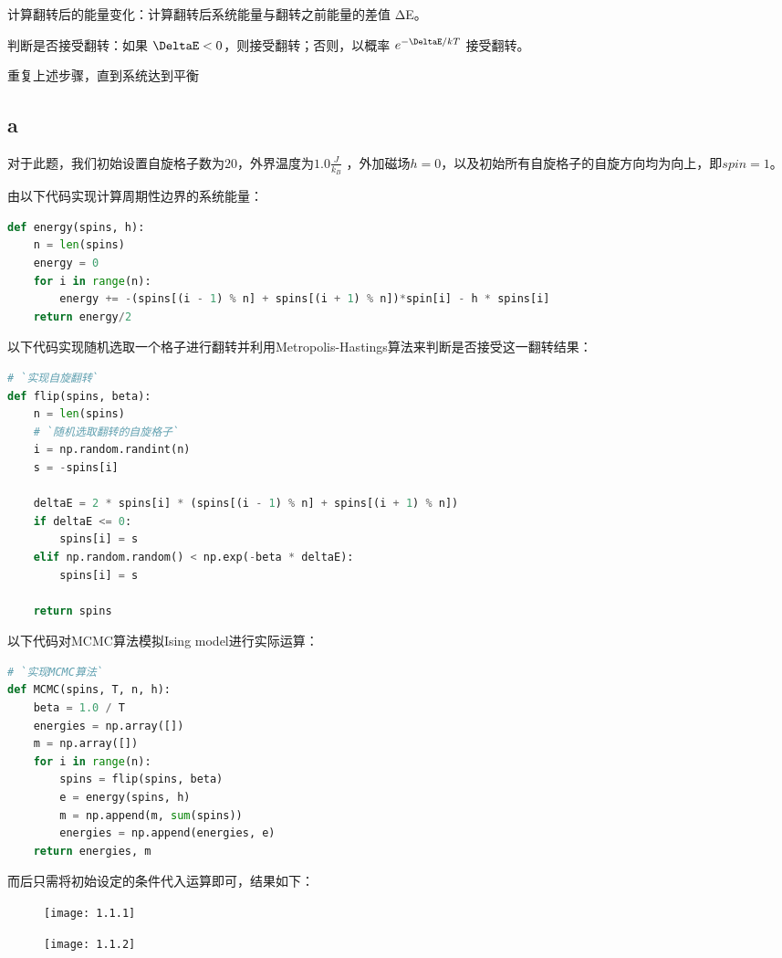 \documentclass[UTF8]{ctexart}
\begin{document}
    计算翻转后的能量变化：计算翻转后系统能量与翻转之前能量的差值 ΔE。

    判断是否接受翻转：如果 \(\DeltaE < 0\)，则接受翻转；否则，以概率 \(e^{-\DeltaE/kT}\) 接受翻转。

    重复上述步骤，直到系统达到平衡

    \subsection{a}\label{subsec:1.1}
    对于此题，我们初始设置自旋格子数为\(20\)，外界温度为\(1.0 \frac{J}{k_B}\) ，外加磁场\(h=0\)，以及初始所有自旋格子的自旋方向均为向上，即\(spin=1\)。

    由以下代码实现计算周期性边界的系统能量：
    \begin{lstlisting}[language=Python, breaklines = true,label={lst:1.1.1}]
def energy(spins, h):
    n = len(spins)
    energy = 0
    for i in range(n):
        energy += -(spins[(i - 1) % n] + spins[(i + 1) % n])*spin[i] - h * spins[i]
    return energy/2
    \end{lstlisting}

    以下代码实现随机选取一个格子进行翻转并利用Metropolis-Hastings算法来判断是否接受这一翻转结果：
    \begin{lstlisting}[language=Python, breaklines = true,label={lst:1.1.2}]
# `实现自旋翻转`
def flip(spins, beta):
    n = len(spins)
    # `随机选取翻转的自旋格子`
    i = np.random.randint(n)
    s = -spins[i]

    deltaE = 2 * spins[i] * (spins[(i - 1) % n] + spins[(i + 1) % n])
    if deltaE <= 0:
        spins[i] = s
    elif np.random.random() < np.exp(-beta * deltaE):
        spins[i] = s

    return spins
    \end{lstlisting}

    以下代码对MCMC算法模拟Ising model进行实际运算：
    \begin{lstlisting}[language=Python, breaklines = true,label={lst:1.1.3}]
# `实现MCMC算法`
def MCMC(spins, T, n, h):
    beta = 1.0 / T
    energies = np.array([])
    m = np.array([])
    for i in range(n):
        spins = flip(spins, beta)
        e = energy(spins, h)
        m = np.append(m, sum(spins))
        energies = np.append(energies, e)
    return energies, m
    \end{lstlisting}

    而后只需将初始设定的条件代入运算即可，结果如下：

    \begin{figure}[h]
        \centering
        \texttt{[image: 1.1.1]}
        \label{fig:1.1.1}
    \end{figure}
    \begin{figure}[h]
        \centering
        \texttt{[image: 1.1.2]}
        \label{fig:1.1.2}
    \end{figure}
\end{document}
